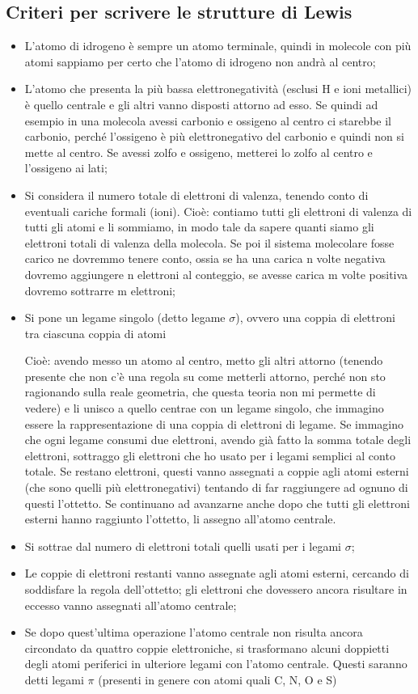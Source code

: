 \subsection{Criteri per scrivere le strutture di Lewis}
\begin{itemize}
    \item L'atomo di idrogeno è sempre un atomo terminale, quindi in molecole con più atomi sappiamo per certo che l'atomo di idrogeno non andrà al centro;
    \item L'atomo che presenta la più bassa elettronegatività (esclusi H e ioni metallici) è quello centrale e gli altri vanno disposti attorno ad esso. Se quindi ad esempio in una molecola avessi carbonio e ossigeno al centro ci starebbe il carbonio, perché l'ossigeno è più elettronegativo del carbonio e quindi non si mette al centro. Se avessi zolfo e ossigeno, metterei lo zolfo al centro e l'ossigeno ai lati;
    \item Si considera il numero totale di elettroni di valenza, tenendo conto di eventuali cariche formali (ioni). Cioè: contiamo tutti gli elettroni di valenza di tutti gli atomi e li sommiamo, in modo tale da sapere quanti siamo gli elettroni totali di valenza della molecola. Se poi il sistema molecolare fosse carico ne dovremmo tenere conto, ossia se ha una carica n volte negativa dovremo aggiungere n elettroni al conteggio, se avesse carica m volte positiva dovremo sottrarre m elettroni;
    \item Si pone un legame singolo (detto legame $\sigma$), ovvero una coppia di elettroni tra ciascuna coppia di atomi
    
    Cioè: avendo messo un atomo al centro, metto gli altri attorno (tenendo presente che non c'è una regola su come metterli attorno, perché non sto ragionando sulla reale geometria, che questa teoria non mi permette di vedere) e li unisco a quello centrae con un legame singolo, che immagino essere la rappresentazione di una coppia di elettroni di legame. Se immagino che ogni legame consumi due elettroni, avendo già fatto la somma totale degli elettroni, sottraggo gli elettroni che ho usato per i legami semplici al conto totale. Se restano elettroni, questi vanno assegnati a coppie agli atomi esterni (che sono quelli più elettronegativi) tentando di far raggiungere ad ognuno di questi l'ottetto. Se continuano ad avanzarne anche dopo che tutti gli elettroni esterni hanno raggiunto l'ottetto, li assegno all'atomo centrale.
    \item Si sottrae dal numero di elettroni totali quelli usati per i legami $\sigma$;
    \item Le coppie di elettroni restanti vanno assegnate agli atomi esterni, cercando di soddisfare la regola dell'ottetto; gli elettroni che dovessero ancora risultare in eccesso vanno assegnati all'atomo centrale;
    \item Se dopo quest'ultima operazione l'atomo centrale non risulta ancora circondato da quattro coppie elettroniche, si trasformano alcuni doppietti degli atomi periferici in ulteriore legami con l'atomo centrale. Questi saranno detti legami $\pi$ (presenti in genere con atomi quali C, N, O e S)
\end{itemize}

